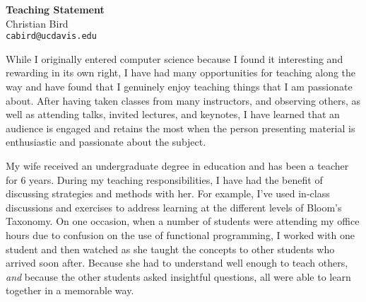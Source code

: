 \documentclass[10pt]{article}
\begin{document}
\lhead{}
\rhead{}
\renewcommand{\headrulewidth}{0pt} 
\renewcommand{\footrulewidth}{0pt} 




\begin{center}
{\LARGE \bf Teaching Statement}\\
\vspace*{0.2cm}
{\large Christian Bird}\\
\vspace*{0.1cm}
\texttt{\normalsize cabird@ucdavis.edu}\\
\end{center}



While I originally entered computer science because I found it interesting and
rewarding in its own right, I have had many opportunities for teaching along
the way and have found that I genuinely enjoy teaching things that I am
passionate about.  After having taken classes from many instructors, and
observing others, as well as attending talks, invited lectures, and keynotes, I
have learned that an audience is engaged and retains the most when the
person presenting material is enthusiastic and passionate about the subject.

My wife received an undergraduate degree in education and has been a teacher
for 6 years.  During my teaching responsibilities, I have had the benefit of
discussing strategies and methods with her.  For example, I've used in-class
discussions and exercises to address learning at the different levels of Bloom's
Taxonomy.  On one occasion, when a number of students were attending my office
hours due to confusion on the use of functional programming, I worked with one
student and then watched as she taught the concepts to other students who arrived
soon after.  Because she had to understand well enough to teach others,
\emph{and} because the other students asked insightful questions, all were able
to learn together in a memorable way.
\end{document}

